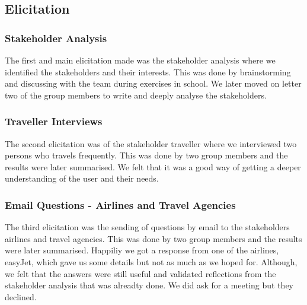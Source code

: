 \subsection{Elicitation}
\subsubsection{Stakeholder Analysis}
The first and main elicitation made was the stakeholder analysis where we identified the stakeholders and their interests. This was done by brainstorming and discussing with the team during exercises in school. We later moved on letter two of the group members to write and deeply analyse the stakeholders.

\subsubsection{Traveller Interviews}
The second elicitation was of the stakeholder traveller where we interviewed two persons who travels frequently. This was done by two group members and the results were later summarised. We felt that it was a good way of getting a deeper understanding of the user and their needs. 

\subsubsection{Email Questions - Airlines and Travel Agencies}
The third elicitation was the sending of questions by email to the stakeholders airlines and travel agencies. This was done by two group members and the results were later summarised. Happiliy we got a response from one of the airlines, easyJet, which gave us some details but not as much as we hoped for. Although, we felt that the answers were still useful and validated reflections from the stakeholder analysis that was alreadty done. We did ask for a meeting but they declined.